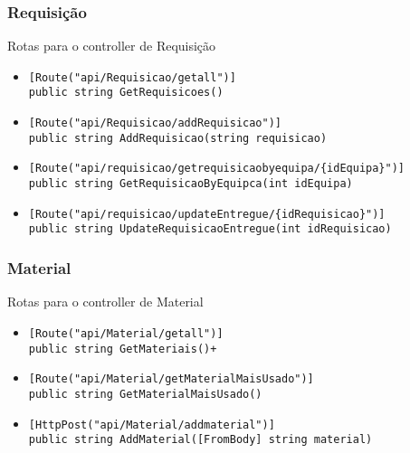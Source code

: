 \subsubsection{Requisição}
Rotas para o controller de Requisição
\begin{itemize}
    \item \begin{lstlisting}
[Route("api/Requisicao/getall")]
public string GetRequisicoes()
            \end{lstlisting}
\end{itemize}
\begin{itemize}
    \item \begin{lstlisting}
[Route("api/Requisicao/addRequisicao")]
public string AddRequisicao(string requisicao)
            \end{lstlisting}
\end{itemize}
\begin{itemize}
    \item \begin{lstlisting}
[Route("api/requisicao/getrequisicaobyequipa/{idEquipa}")]
public string GetRequisicaoByEquipca(int idEquipa)
             \end{lstlisting}
\end{itemize}

\begin{itemize}
    \item \begin{lstlisting}
[Route("api/requisicao/updateEntregue/{idRequisicao}")]
public string UpdateRequisicaoEntregue(int idRequisicao)
             \end{lstlisting}
\end{itemize}

\vfill
\subsubsection{Material}
Rotas para o controller de Material

\begin{itemize}
    \item \begin{lstlisting}
[Route("api/Material/getall")]
public string GetMateriais()+
             \end{lstlisting}
\end{itemize}
\begin{itemize}
    \item \begin{lstlisting}
[Route("api/Material/getMaterialMaisUsado")]
public string GetMaterialMaisUsado()
             \end{lstlisting}
\end{itemize}
\begin{itemize}
    \item \begin{lstlisting}
[HttpPost("api/Material/addmaterial")]
public string AddMaterial([FromBody] string material)
             \end{lstlisting}
\end{itemize}


